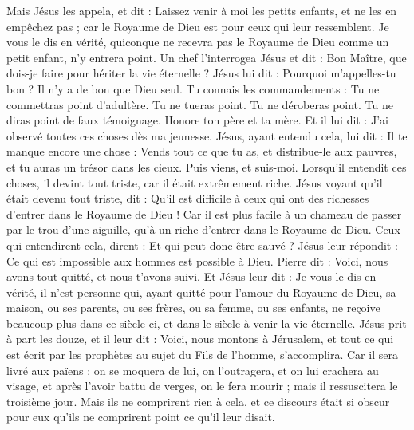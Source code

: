 \begin{multicols}{2}
{Mais Jésus les appela, et dit : Laissez venir à moi les petits enfants, et ne les en empêchez pas ; car le Royaume de Dieu est pour ceux qui leur ressemblent.
Je vous le dis en vérité, quiconque ne recevra pas le Royaume de Dieu comme un petit enfant, n'y entrera point.
Un chef l'interrogea Jésus et dit : Bon Maître, que dois-je faire pour hériter la vie éternelle ?
Jésus lui dit : Pourquoi m'appelles-tu bon ? Il n'y a de bon que Dieu seul.
Tu connais les commandements : Tu ne commettras point d’adultère. Tu ne tueras point. Tu ne déroberas point. Tu ne diras point de faux témoignage. Honore ton père et ta mère.
Et il lui dit : J’ai observé toutes ces choses dès ma jeunesse.
Jésus, ayant entendu cela, lui dit : Il te manque encore une chose : Vends tout ce que tu as, et distribue-le aux pauvres, et tu auras un trésor dans les cieux. Puis viens, et suis-moi.
Lorsqu’il entendit ces choses, il devint tout triste, car il était extrêmement riche.
Jésus voyant qu'il était devenu tout triste, dit : Qu’il est difficile à ceux qui ont des richesses d’entrer dans le Royaume de Dieu !
Car il est plus facile à un chameau de passer par le trou d'une aiguille, qu’à un riche d’entrer dans le Royaume de Dieu.
Ceux qui entendirent cela, dirent : Et qui peut donc être sauvé ?
Jésus leur répondit : Ce qui est impossible aux hommes est possible à Dieu.
Pierre dit : Voici, nous avons tout quitté, et nous t'avons suivi.
Et Jésus leur dit : Je vous le dis en vérité, il n’est personne qui, ayant quitté pour l'amour du Royaume de Dieu, sa maison, ou ses parents, ou ses frères, ou sa femme, ou ses enfants,
ne reçoive beaucoup plus dans ce siècle-ci, et dans le siècle à venir la vie éternelle.
Jésus prit à part les douze, et il leur dit : Voici, nous montons à Jérusalem, et tout ce qui est écrit par les prophètes au sujet du Fils de l'homme, s’accomplira.
Car il sera livré aux païens ; on se moquera de lui, on l’outragera, et on lui crachera au visage,
et après l’avoir battu de verges, on le fera mourir ; mais il ressuscitera le troisième jour.
Mais ils ne comprirent rien à cela, et ce discours était si obscur pour eux qu'ils ne comprirent point ce qu'il leur disait.
}
\end{multicols}
